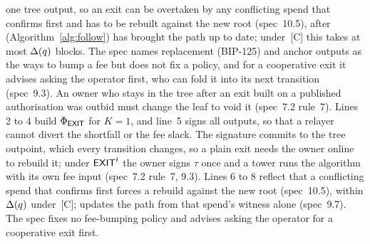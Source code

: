 {one tree output, so an exit can be overtaken by any conflicting spend
that confirms first and has to be rebuilt against the new root
(spec~10.5), after  (Algorithm~\ref{alg:follow}) has
brought the path up to date; under~[C] this takes at most $\Delta(q)$ blocks. The spec names
replacement (BIP-125) and anchor outputs as the ways to bump a fee but
does not fix a policy, and for a cooperative exit it advises asking the
operator first, who can fold it into its next transition (spec~9.3). An
owner who stays in the tree after an exit built on a published
authorisation was outbid must change the leaf to void it (spec~7.2
rule~7).
\else
Lines 2 to 4 build $\Phi_{\textsf{EXIT}}$ for $K = 1$, and line~5 signs all
outputs, so that a relayer cannot divert the shortfall or the fee slack.
The signature commits to the tree outpoint, which every transition
changes, so a plain exit needs the owner online to rebuild it; under
$\textsf{EXIT}^{t}$ the owner signs $\tau$ once and a tower runs the algorithm
with its own fee input (spec~7.2 rule~7, 9.3). Lines 6 to 8 reflect that a
conflicting spend that confirms first forces a rebuild against the new
root (spec~10.5), within $\Delta(q)$ under~[C];  updates the path
from that spend's witness alone (spec~9.7). The spec fixes no fee-bumping
policy and advises asking the operator for a cooperative exit first.
\fi
}


